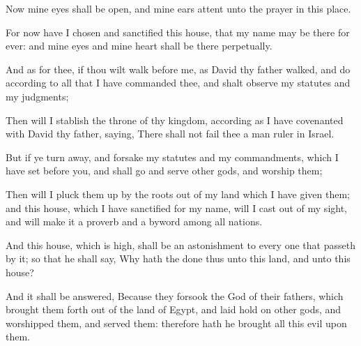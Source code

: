 {Now mine
eyes shall be
open, and mine
ears
attent unto the
prayer
{} in this
place.

For now have I
chosen and
sanctified this
house, that my
name may be there
for
ever: and mine
eyes and mine
heart shall be there
perpetually.

And as for thee, if thou wilt
walk
before me, as
David thy
father
walked, and
do according to all that I have
commanded thee, and shalt
observe my
statutes and my
judgments;

Then will I
stablish the
throne of thy
kingdom, according as I have
covenanted with
David thy
father,
saying, There shall not
fail thee a
man
{}
ruler in
Israel.

But if ye turn
away, and
forsake my
statutes and my
commandments, which I have
set
before you, and shall
go and
serve
other
gods, and
worship them;

Then will I pluck them up by the
roots out of my
land which I have
given them; and this
house, which I have
sanctified for my
name, will I cast
out of my
sight, and will
make it
{} a
proverb and a
byword among all
nations.

And this
house, which is
high, shall be an
astonishment to every one that
passeth by it; so that he shall
say, Why hath the
{}
done thus unto this
land, and unto this
house?

And it shall be
answered, Because they
forsook the
{}
God of their
fathers, which brought them
forth out of the
land of
Egypt, and laid
hold on
other
gods, and
worshipped them, and
served them: therefore hath he
brought all this
evil upon them.




\par }
